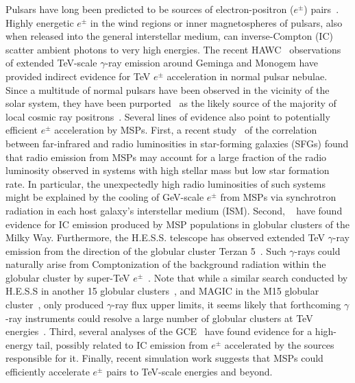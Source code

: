 \documentclass[doublespace,draft,nopageskip]{VTthesis} %
\begin{document}
Pulsars have long been predicted to be sources of electron-positron ($e^{\pm}$) pairs~\citep{Erber:1966,Sturrock:1970,Sturrock:1971, Aharonian:1995, Atoyan:1995}. Highly energetic $e^{\pm}$ in the wind regions or inner magnetospheres of pulsars, 
also when released into the general interstellar medium,
can inverse-Compton (IC) scatter ambient photons to very high energies. 
The recent HAWC~\citep{Abeysekara:2017old} observations of extended TeV-scale $\gamma$-ray emission around Geminga and Monogem have provided indirect evidence for TeV $e^{\pm}$ acceleration in normal pulsar nebulae.  Since a multitude of normal pulsars have been observed in the vicinity of the solar system, they have been purported~\citep{Hooper:2008kg, Delahaye:2010,Abeysekara:2017old,Hooper:2017gtd, Profumo:2018fmz, DiMauro:2019yvh, Johannesson:2019jlk} as the likely source of the majority of local cosmic ray positrons~\citep{Aguilar:2013qda}.    
Several lines of evidence also point to potentially efficient $e^{\pm}$ acceleration by MSPs. First, a recent study~\citep{Sudoh:2020hyu} of the correlation between far-infrared and radio luminosities in star-forming galaxies (SFGs) found that radio emission from MSPs may account for a large fraction of the radio luminosity observed in systems with high stellar mass but low star formation rate. 
%
In particular, the unexpectedly high radio luminosities of such
systems
might be explained by the cooling of GeV-scale $e^{\pm}$ from MSPs via synchrotron radiation in each host galaxy's interstellar medium (ISM). Second, ~\citet{Song:2021zrs} have found evidence for IC emission produced by MSP populations in globular clusters of the Milky Way. Furthermore, the H.E.S.S. telescope has observed extended TeV $\gamma$-ray emission from the direction of the globular cluster Terzan 5~\citep{Abramowski:2013md}. Such $\gamma$-rays could naturally arise from Comptonization of the background radiation within the globular cluster by super-TeV $e^{\pm}$~\citep{Bednarek:2016gpp}. 
%
Note that while a similar search conducted by H.E.S.S in another 15 globular clusters~\citep{Abramowski:2013md}, and MAGIC in the M15 globular cluster~\citep{Acciari:2019ysf}, only produced $\gamma$-ray flux upper limits, it seems likely that forthcoming $\gamma$-ray instruments could resolve a large number of globular clusters at TeV energies~\citep{Ndiyavala:2017hoh,Ndiyavala-Davids:2020wjc}. 
Third, several analyses of the GCE~\citep[e.g.,][]{Horiuchi:2016zwu,Linden:2016rcf,DiMauro:2021raz} have found evidence for a high-energy tail, possibly related to IC emission from $e^\pm$ accelerated by the sources responsible for it. 
%
Finally, recent simulation work \citep{Guepin:2019fjb} suggests that MSPs could efficiently accelerate $e^{\pm}$ pairs to TeV-scale energies and beyond. 
\end{document}
